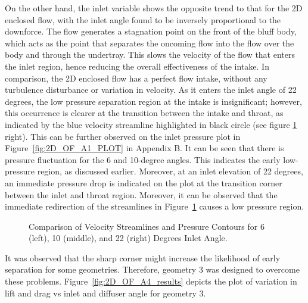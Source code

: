 \noindent On the other hand, the inlet variable shows the opposite  trend to that for the 2D enclosed flow, with the inlet angle found to be inversely proportional to the downforce. The flow generates a stagnation point on the front of the bluff body, which acts as the point that separates the oncoming flow into the flow over the body and through the undertray. This slows the velocity of the flow that enters the inlet region, hence reducing the overall effectiveness of the intake. In comparison, the 2D enclosed flow has a perfect flow intake, without any turbulence disturbance or variation in velocity. As it enters the inlet angle of 22 degrees, the low pressure separation region at the intake is insignificant; however, this occurrence is clearer at the transition between the intake and throat, as indicated by the blue velocity streamline highlighted in black circle (see figure \ref{fig:A1_Contour_inlet_compare} right). This can be further observed on the inlet pressure plot in Figure~\ref{fig:2D_OF_A1_PLOT} in Appendix B. It can be seen that there is pressure fluctuation for the 6 and 10-degree angles. This indicates the early low-pressure region, as discussed earlier. Moreover, at an inlet elevation of 22 degrees, an immediate pressure drop is indicated on the plot at the transition corner between the inlet and throat region. Moreover, it can be observed that the immediate redirection of the streamlines in Figure~\ref{fig:A1_Contour_inlet_compare} causes a low pressure region.

\begin{figure}[!h]
   \noindent{}
   \caption{Comparison of Velocity Streamlines and Pressure Contours for 6 (left), 10 (middle), and 22 (right) Degrees Inlet Angle.}
   \label{fig:A1_Contour_inlet_compare}
\end{figure}

\noindent It was observed that the sharp corner might increase the likelihood of early separation for some geometries. Therefore, geometry 3 was designed to overcome these problems. Figure~\ref{fig:2D_OF_A4_results} depicts the plot of variation in lift and drag vs inlet and diffuser angle for geometry 3.

